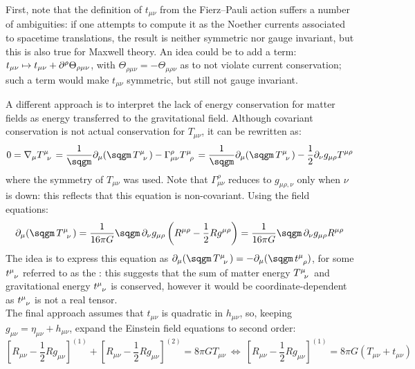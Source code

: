 First, note that the definition of $ t_{\mu \nu} $ from the Fierz--Pauli action suffers a number of ambiguities: if one attempts to compute it as the Noether currents associated to spacetime translations, the result is neither symmetric nor gauge invariant, but this is also true for Maxwell theory. An idea could be to add a term: $ t_{\mu \nu} \mapsto t_{\mu \nu} + \partial^\rho \Theta_{\rho \mu \nu} $, with $ \Theta_{\rho \mu \nu} = - \Theta_{\mu \rho \nu} $ as to not violate current conservation; such a term would make $ t_{\mu \nu} $ symmetric, but still not gauge invariant.

A different approach is to interpret the lack of energy conservation for matter fields as energy transferred to the gravitational field. Although covariant conservation is not actual conservation for $ T_{\mu \nu} $, it can be rewritten as:
\begin{equation*}
  0 = \na_\mu \tensor{T}{^\mu_\nu} = \frac{1}{\sqgm} \pa_\mu (\sqgm\, \tensor{T}{^\mu_\nu}) - \Gamma^\rho_{\mu \nu} \tensor{T}{^\mu_\rho} = \frac{1}{\sqgm} \pa_\mu (\sqgm\, \tensor{T}{^\mu_\nu}) - \frac{1}{2} \pa_\nu g_{\mu \rho} T^{\mu \rho}
\end{equation*}
where the symmetry of $ T_{\mu \nu} $ was used. Note that $ \Gamma^\rho_{\mu \nu} $ reduces to $ g_{\mu \rho , \nu} $ only when $ \nu $ is down: this reflects that this equation is non-covariant. Using the field equations:
\begin{equation*}
  \pa_\mu (\sqgm\, \tensor{T}{^\mu_\nu}) = \frac{1}{16\pi G} \sqgm\, \pa_\nu g_{\mu \rho} \left( R^{\mu \rho} - \frac{1}{2} R g^{\mu \rho} \right) = \frac{1}{16\pi G} \sqgm\, \pa_\nu g_{\mu \rho} R^{\mu \rho}
\end{equation*}
The idea is to express this equation as $ \pa_\mu (\sqgm\, \tensor{T}{^\mu_\nu}) = - \pa_\mu (\sqgm\, \tensor{t}{^\mu_\rho}) $, for some $ \tensor{t}{^\mu_\nu} $ referred to as the : this suggests that the sum of matter energy $ \tensor{T}{^\mu_\nu} $ and gravitational energy $ \tensor{t}{^\mu_\nu} $ is conserved, however it would be coordinate-dependent as $ \tensor{t}{^\mu_\nu} $ is not a real tensor.\\
The final approach assumes that $ t_{\mu \nu} $ is quadratic in $ h_{\mu \nu} $, so, keeping $ g_{\mu \nu} = \eta_{\mu \nu} + h_{\mu \nu} $, expand the Einstein field equations to second order:
\begin{equation*}
  \left[ R_{\mu \nu} - \frac{1}{2} R g_{\mu \nu} \right]^{(1)} + \left[ R_{\mu \nu} - \frac{1}{2} R g_{\mu \nu} \right]^{(2)} = 8\pi G T_{\mu \nu}
  \ \iff \
  \left[ R_{\mu \nu} - \frac{1}{2} R g_{\mu \nu} \right]^{(1)} = 8\pi G (T_{\mu \nu} + t_{\mu \nu})
\end{equation*}
